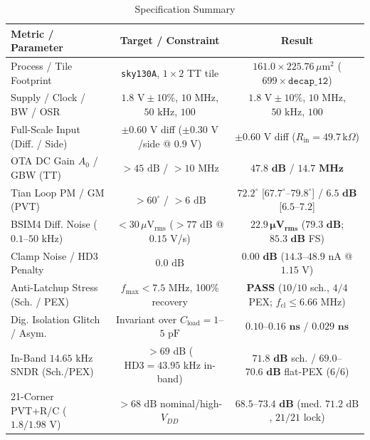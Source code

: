 \documentclass[10pt,twocolumn,letterpaper]{article}
\begin{document}
\begin{table}[b]
\centering
\caption{Specification Summary}
\label{tab:spec}
\scriptsize
\setlength{\tabcolsep}{4.0pt}
\begin{tabular}{@{}lcc@{}}
\toprule
\textbf{Metric / Parameter} & \textbf{Target / Constraint} & \textbf{Result} \\
\midrule
Process / Tile Footprint & \texttt{sky130A}, $1\times2$ TT tile & $161.0 \times 225.76\,\mu\text{m}^2$ ($699\times\texttt{decap\_12}$) \\
Supply / Clock / BW / OSR & $1.8\text{ V}\pm10\%$, $10\text{ MHz}$, $50\text{ kHz}$, $100$ & $1.8\text{ V}\pm10\%$, $10\text{ MHz}$, $50\text{ kHz}$, $100$ \\
Full-Scale Input (Diff. / Side) & $\pm0.60\text{ V}$ diff ($\pm0.30\text{ V}$/side @ $0.9\text{ V}$) & $\pm0.60\text{ V}$ diff ($R_{\text{in}}=49.7\,\text{k}\Omega$) \\
\midrule
OTA DC Gain $A_0$ / GBW (TT) & $>45\text{ dB}$ / $>10\text{ MHz}$ & $\mathbf{47.8\text{ dB}}$ / $\mathbf{14.7\text{ MHz}}$ \\
Tian Loop PM / GM (PVT) & $>60^\circ$ / $>6\text{ dB}$ & $\mathbf{72.2^\circ}$ [$67.7^\circ$--$79.8^\circ$] / $\mathbf{6.5\text{ dB}}$ [$6.5$--$7.2$] \\
BSIM4 Diff. Noise ($0.1$--$50\text{ kHz}$) & $<30\,\mu\text{V}_{\text{rms}}$ ($>77\text{ dB}$ @ $0.15\text{ V}$/s) & $\mathbf{22.9\,\mu\text{V}_{\text{rms}}}$ ($\mathbf{79.3\text{ dB}}$; $\mathbf{85.3\text{ dB}}$ FS) \\
Clamp Noise / HD3 Penalty & $0.0\text{ dB}$ & $\mathbf{0.00\text{ dB}}$ ($14.3$--$48.9\text{ nA}$ @ $1.15\text{ V}$) \\
\midrule
Anti-Latchup Stress (Sch. / PEX) & $f_{\text{max}}<7.5\text{ MHz}$, 100\% recovery & \textcolor{okgreen}{\textbf{PASS}} ($10/10$ sch., $4/4$ PEX; $f_{\text{cl}}\le6.66\text{ MHz}$) \\
Dig. Isolation Glitch / Asym. & Invariant over $C_{\text{load}}=1$--$5\text{ pF}$ & $\mathbf{0.10}$--$\mathbf{0.16\text{ ns}}$ / $\mathbf{0.029\text{ ns}}$ \\
In-Band $14.65\text{ kHz}$ SNDR (Sch./PEX) & $>69\text{ dB}$ ($\text{HD3}=43.95\text{ kHz}$ in-band) & $\mathbf{71.8\text{ dB}}$ sch. / $\mathbf{69.0}$--$\mathbf{70.6\text{ dB}}$ flat-PEX (6/6) \\
21-Corner PVT+R/C ($1.8/1.98\text{ V}$) & $>68\text{ dB}$ nominal/high-$V_{DD}$ & $\mathbf{68.5}$--$\mathbf{73.4\text{ dB}}$ (med. $71.2\text{ dB}$, $21/21$ lock) \\

\end{tabular}
\end{table}
\end{document}
